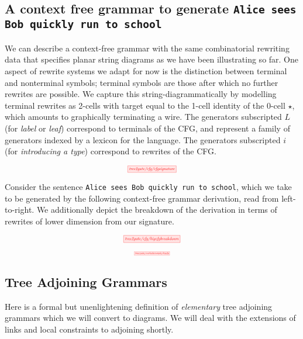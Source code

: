 \begin{fullwidth}

\subsection{A context free grammar to generate \texttt{Alice sees Bob quickly run to school}}

We can describe a context-free grammar with the same combinatorial rewriting data that specifies planar string diagrams as we have been illustrating so far. One aspect of rewrite systems we adapt for now is the distinction between terminal and nonterminal symbols; terminal symbols are those after which no further rewrites are possible. We capture this string-diagrammatically by modelling terminal rewrites as 2-cells with target equal to the 1-cell identity of the 0-cell $\star$, which amounts to graphically terminating a wire. The generators subscripted $L$ (for \emph{label} or \emph{leaf}) correspond to terminals of the CFG, and represent a family of generators indexed by a lexicon for the language. The generators subscripted $i$ (for \emph{introducing a type}) correspond to rewrites of the CFG.

\[\scalebox{0.5}{\tikzfig{tree2gate/cfg/cfgsignature}}\]

Consider the sentence \texttt{Alice sees Bob quickly run to school}, which we take to be generated by the following context-free grammar derivation, read from left-to-right. We additionally depict the breakdown of the derivation in terms of rewrites of lower dimension from our signature.

\[\scalebox{0.5}{\tikzfig{tree2gate/cfg/bigcfgbreakdown}}\]

\[\scalebox{0.3}{\tikzfig{tree2gate/workedexample/bigcfg}}\]

\subsection{Tree Adjoining Grammars}

Here is a formal but unenlightening definition of \emph{elementary} tree adjoining grammars which we will convert to diagrams. We will deal with the extensions of links and local constraints to adjoining shortly.


\end{fullwidth}
